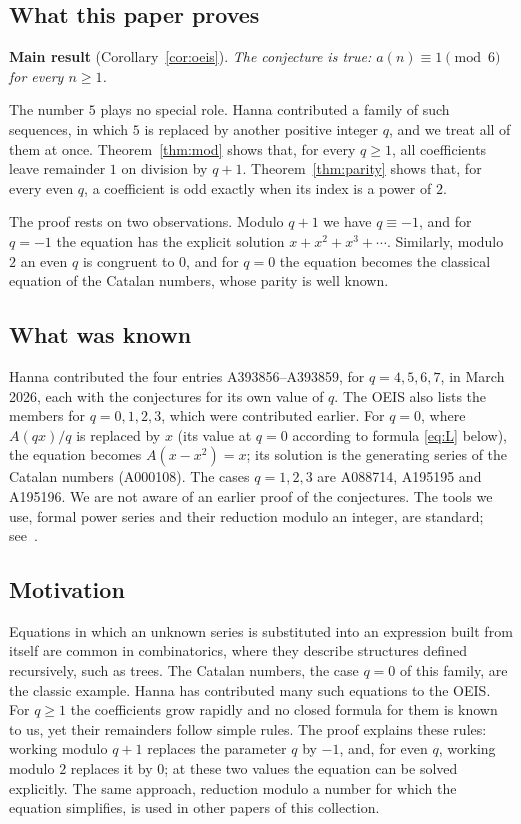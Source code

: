 \documentclass[11pt,a4paper]{article}
\theoremstyle{definition}
\theoremstyle{remark}
\begin{document}
\subsection{What this paper proves}
\textbf{Main result} (Corollary~\ref{cor:oeis}). \emph{The conjecture is true: $a(n)\equiv1\pmod{6}$ for every $n\ge1$.}

The number $5$ plays no special role. Hanna contributed a family of such sequences, in which
$5$ is replaced by another positive integer $q$, and we treat all of them at once.
Theorem~\ref{thm:mod} shows that, for every $q\ge1$, all coefficients leave remainder $1$ on division by $q+1$.
Theorem~\ref{thm:parity} shows that, for every even $q$, a coefficient is odd exactly when its index is a power of $2$.

The proof rests on two observations. Modulo $q+1$ we have $q\equiv-1$, and for $q=-1$ the equation has the
explicit solution $x+x^2+x^3+\cdots$. Similarly, modulo $2$ an even $q$ is congruent to $0$, and for $q=0$ the
equation becomes the classical equation of the Catalan numbers, whose parity is well known.

\subsection{What was known}
Hanna contributed the four entries A393856--A393859, for $q=4,5,6,7$, in March 2026, each with the conjectures for its
own value of $q$. The OEIS also lists the members for $q=0,1,2,3$, which were contributed earlier. For $q=0$, where
$A(qx)/q$ is replaced by $x$ (its value at $q=0$ according to formula \eqref{eq:L} below), the equation becomes
$A(x-x^2)=x$; its solution is the generating series of the Catalan numbers (A000108). The cases $q=1,2,3$ are
A088714, A195195 and A195196. We are not aware of an earlier proof of the conjectures. The tools we use, formal power
series and their reduction modulo an integer, are standard; see~\cite{niven,stanley}.

\subsection{Motivation}
Equations in which an unknown series is substituted into an expression built from itself are common in
combinatorics, where they describe structures defined recursively, such as trees. The Catalan numbers, the case $q=0$
of this family, are the classic example. Hanna has contributed many such equations to the OEIS. For $q\ge1$ the
coefficients grow rapidly and no closed formula for them is known to us, yet their remainders follow simple rules. The
proof explains these rules: working modulo $q+1$ replaces the parameter $q$ by $-1$, and, for even $q$, working modulo
$2$ replaces it by $0$; at these two values the equation can be solved explicitly. The same approach, reduction modulo
a number for which the equation simplifies, is used in other papers of this collection.
\end{document}
